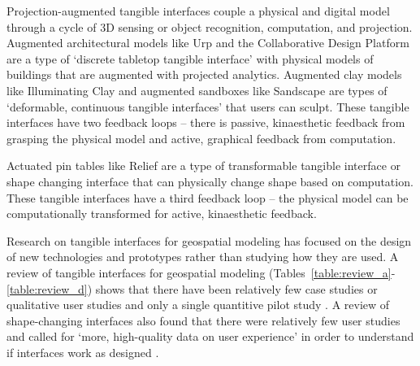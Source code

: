 \documentclass[prodmode,acmtochi]{acmsmall} %
\begin{document}
Projection-augmented tangible interfaces 
couple a physical and digital model
through a cycle of 3D sensing or object recognition,
computation, and projection. 
%
Augmented architectural models
like Urp \cite{Underkoffler1999} 
and the Collaborative Design Platform \cite{Schubert2011}
are a type of 
`discrete tabletop tangible interface' \cite{Ishii2012}
with physical models of buildings 
that are augmented with projected analytics.
%
Augmented clay models 
like Illuminating Clay \cite{Piper2002a} 
and augmented sandboxes like Sandscape \cite{Ishii2004} 
are types of 
`deformable, continuous tangible interfaces' \cite{Ishii2012}
that users can sculpt. 
%
These tangible interfaces 
have two feedback loops -- 
there is passive, kinaesthetic feedback from grasping the physical model 
and active, graphical feedback from computation.

Actuated pin tables
like Relief \cite{Leithinger2009}
are a type of transformable tangible interface \cite{Ishii2012} 
or shape changing interface \cite{Rasmussen2012}
that can physically change shape based on computation.
%
These tangible interfaces 
have a third feedback loop --
the physical model
can be computationally transformed
for active, kinaesthetic feedback. 

Research on tangible interfaces for geospatial modeling 
has focused on the design of new technologies and prototypes
rather than studying how they
are used. 
%
A review of tangible interfaces for geospatial modeling 
(Tables~\ref{table:review_a}-\ref{table:review_d})
shows that there have been 
relatively few case studies \cite{Ishii2002,Tateosian2010,Petrasova2015} 
or qualitative user studies \cite{Shamonsky2003}
and only a single quantitive pilot study \cite{Harmon2016}.
%
A review of shape-changing interfaces 
also found that there were relatively few user studies
and called for `more, high-quality data on user experience'
in order to understand if interfaces work as designed
\cite{Rasmussen2012}.


% 
% 
\end{document}
